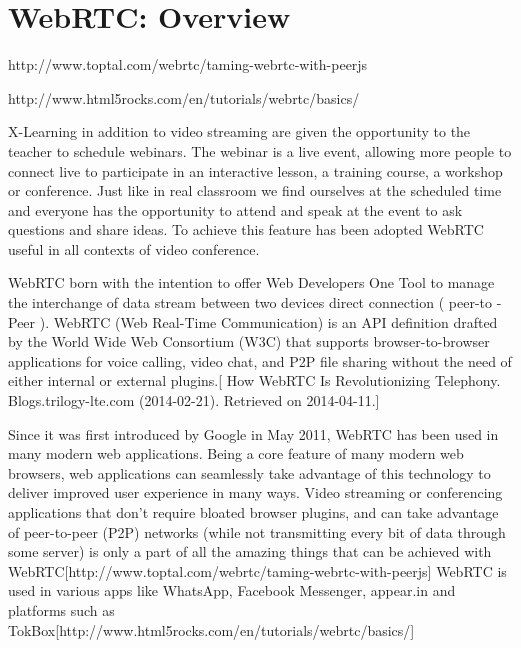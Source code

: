\section{WebRTC: Overview}
\label{sec:WebRTC: Overview}


http://www.toptal.com/webrtc/taming-webrtc-with-peerjs

http://www.html5rocks.com/en/tutorials/webrtc/basics/


X-Learning in addition to video streaming are given the opportunity to the teacher to schedule webinars.
The webinar is a live event, allowing more people to connect live to participate in an interactive lesson, a training course, a workshop or conference. Just like in real classroom we find ourselves at the scheduled time and everyone has the opportunity to attend and speak at the event to ask questions and share ideas.
To achieve this feature has been adopted WebRTC useful in all contexts of video conference.

WebRTC born with the intention to offer Web Developers One Tool to manage the interchange of data stream between two devices direct connection ( peer-to -Peer ).
WebRTC (Web Real-Time Communication) is an API definition drafted by the World Wide Web Consortium (W3C) that supports browser-to-browser applications for voice calling, video chat, and P2P file sharing without the need of either internal or external plugins.[ How WebRTC Is Revolutionizing Telephony. Blogs.trilogy-lte.com (2014-02-21). Retrieved on 2014-04-11.]

Since it was first introduced by Google in May 2011, WebRTC has been used in many modern web applications. Being a core feature of many modern web browsers, web applications can seamlessly take advantage of this technology to deliver improved user experience in many ways. Video streaming or conferencing applications that don’t require bloated browser plugins, and can take advantage of peer-to-peer (P2P) networks (while not transmitting every bit of data through some server) is only a part of all the amazing things that can be achieved with WebRTC[http://www.toptal.com/webrtc/taming-webrtc-with-peerjs]
WebRTC is used in various apps like WhatsApp, Facebook Messenger, appear.in and platforms such as TokBox[http://www.html5rocks.com/en/tutorials/webrtc/basics/]
